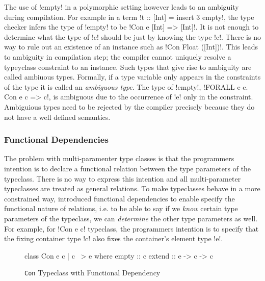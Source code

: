 \documentclass[manuscript,screen,nonacm]{acmart}
\begin{document}
The use of !empty! in a polymorphic setting however leads to an ambiguity during compilation. For example in a term !t :: [Int] = insert 3 empty!, the type checker infers the type of !empty! to be !Con e [Int] => [Int]!. It is not enough to determine what the type of !e! should be just by knowing the type !c!. There is no way to rule out an existence of an instance such as !Con Float ([Int])!. This leads to ambiguity in compilation step; the compiler cannot uniquely resolve a typeyclass constraint to an instance. Such types that give rise to ambiguity are called ambiuous types. Formally, if a type variable only appears in the constraints of the type it is called an \emph{ambiguous type}. The type of !empty!, !FORALL e c. Con e c => c!, is ambiguous due to the occurrence of !e! only in the constraint. Ambiguious types need to be rejected by the compiler precisely because they do not have a well defined semantics. %

\subsubsection{Functional Dependencies}
The problem with multi-paramenter type classes is that the programmers intention is to declare a functional relation between the type parameters of the typeclass. There is no way to express this intention and all multi-parameter typeclasses are treated as general relations. To make typeclasses behave in a more constrained way, \citet{jones_tcfd_2000} introduced functional dependencies to enable specify the functional nature of relations, i.e. to be able to say if we \emph{know} certain type parameters of the typeclass, we can \emph{determine} the other type parameters as well. For example, for !Con e c! typeclass, the programmers intention is to specify that the fixing container type !c! also fixes the container's element type !e!.

\begin{figure}[ht]
\begin{CenteredBox}
\begin{code}
class Con e c | c ~> e where
  empty :: c
  extend :: e -> c -> c
\end{code}
\end{CenteredBox}
\caption[\lstinline{Con} typeclass]{\lstinline{Con} Typeclass with Functional Dependency}
\label{fig:tc-collection-fd}
\end{figure}
\end{document}
